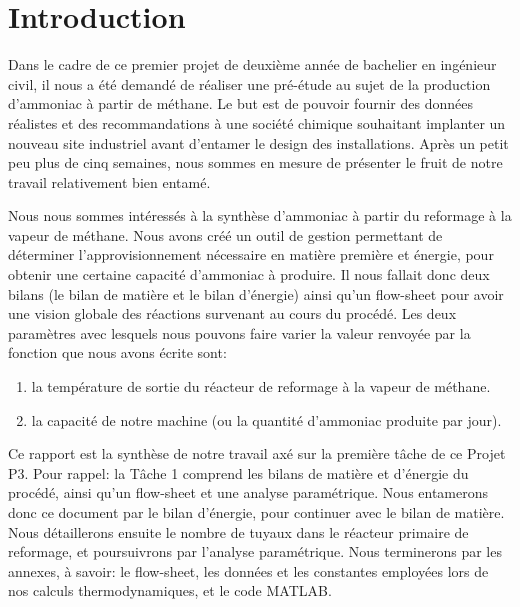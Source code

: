 \section{Introduction}

Dans le cadre de ce premier projet de deuxième année de bachelier en ingénieur civil, il nous a été demandé
de réaliser une pré-étude au sujet de la production d'ammoniac à partir de méthane. Le but est de pouvoir fournir
des données réalistes et des recommandations à une société chimique souhaitant implanter un nouveau site industriel
avant d’entamer le design des installations. Après un petit peu plus de cinq semaines, nous sommes en
mesure de présenter le fruit de notre travail relativement bien entamé. 

Nous nous sommes intéressés à la synthèse d’ammoniac à partir du reformage à la vapeur de méthane. Nous avons
créé un outil de gestion permettant de déterminer l’approvisionnement nécessaire en matière première et énergie, pour
obtenir une certaine capacité d'ammoniac à produire. Il nous fallait donc deux bilans (le bilan de matière et le
bilan d'énergie) ainsi qu'un flow-sheet pour avoir une vision globale des réactions survenant au cours du procédé. Les
deux paramètres avec lesquels nous pouvons faire varier la valeur renvoyée par la fonction que nous avons écrite sont:

\begin{enumerate}
\item la température de sortie du réacteur de reformage à la vapeur de méthane.
\item la capacité de notre machine (ou la quantité d'ammoniac  produite par jour).
\end{enumerate}


Ce rapport est la synthèse de notre travail axé sur la première tâche de ce Projet P3. Pour rappel: la Tâche 1 comprend
les bilans de matière et d’énergie du procédé, ainsi qu'un flow-sheet et une analyse paramétrique. Nous entamerons donc ce
document par le bilan d'énergie, pour continuer avec le bilan de matière. Nous détaillerons ensuite le nombre de tuyaux
dans le réacteur primaire de reformage, et poursuivrons par l'analyse paramétrique. Nous terminerons par les annexes, à
savoir: le flow-sheet, les données et les constantes employées lors de nos calculs thermodynamiques, et le code \textsc{MATLAB}.		
